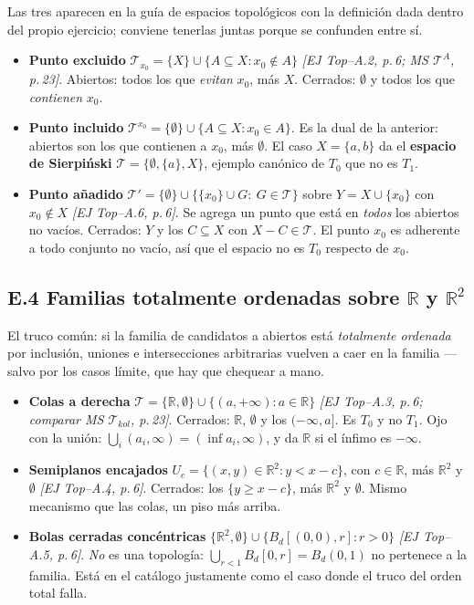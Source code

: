 \documentclass[11pt,a4paper]{article}
\theoremstyle{definition}
\theoremstyle{plain}
\newcommand{\fnt}[1]{{\normalfont\small\itshape\color{gray!150!black}[#1]}}
\newcommand{\R}{\mathbb{R}}
\newcommand{\Bola}[2]{B_d(#1,#2)}
\newcommand{\Bolac}[2]{B_d[#1,#2]}
\newcommand{\tp}{\mathcal{T}}
\begin{document}
\noindent Las tres aparecen en la guía de espacios topológicos con la definición dada dentro del propio ejercicio; conviene tenerlas juntas porque se confunden entre sí.

\begin{itemize}[leftmargin=1.4em,itemsep=3pt]
\item \textbf{Punto excluido} $\tp_{x_0}=\{X\}\cup\{A\subseteq X: x_0\notin A\}$ \fnt{EJ Top--A.2, p.\,6; MS $\tp^{A}$, p.\,23}. Abiertos: todos los que \emph{evitan} $x_0$, más $X$. Cerrados: $\emptyset$ y todos los que \emph{contienen} $x_0$.
\item \textbf{Punto incluido} $\tp^{x_0}=\{\emptyset\}\cup\{A\subseteq X: x_0\in A\}$. Es la dual de la anterior: abiertos son los que contienen a $x_0$, más $\emptyset$. El caso $X=\{a,b\}$ da el \textbf{espacio de Sierpi\'nski} $\tp=\{\emptyset,\{a\},X\}$, ejemplo canónico de $T_0$ que no es $T_1$.
\item \textbf{Punto añadido} $\tp'=\{\emptyset\}\cup\{\{x_0\}\cup G:\ G\in\tp\}$ sobre $Y=X\cup\{x_0\}$ con $x_0\notin X$ \fnt{EJ Top--A.6, p.\,6}. Se agrega un punto que está en \emph{todos} los abiertos no vacíos. Cerrados: $Y$ y los $C\subseteq X$ con $X-C\in\tp$. El punto $x_0$ es adherente a todo conjunto no vacío, así que el espacio no es $T_0$ respecto de $x_0$.
\end{itemize}

\subsection*{E.4 Familias totalmente ordenadas sobre $\R$ y $\R^2$}

\noindent El truco común: si la familia de candidatos a abiertos está \emph{totalmente ordenada} por inclusión, uniones e intersecciones arbitrarias vuelven a caer en la familia --- salvo por los casos límite, que hay que chequear a mano.

\begin{itemize}[leftmargin=1.4em,itemsep=3pt]
\item \textbf{Colas a derecha} $\tp=\{\R,\emptyset\}\cup\{(a,+\infty): a\in\R\}$ \fnt{EJ Top--A.3, p.\,6; comparar MS $\tp_{kol}$, p.\,23}. Cerrados: $\R$, $\emptyset$ y los $(-\infty,a]$. Es $T_0$ y no $T_1$. Ojo con la unión: $\bigcup_i (a_i,\infty)=(\inf a_i,\infty)$, y da $\R$ si el ínfimo es $-\infty$.
\item \textbf{Semiplanos encajados} $U_c=\{(x,y)\in\R^2: y<x-c\}$, con $c\in\R$, más $\R^2$ y $\emptyset$ \fnt{EJ Top--A.4, p.\,6}. Cerrados: los $\{y\ge x-c\}$, más $\R^2$ y $\emptyset$. Mismo mecanismo que las colas, un piso más arriba.
\item \textbf{Bolas cerradas concéntricas} $\{\R^2,\emptyset\}\cup\{\Bolac{(0,0)}{r}: r>0\}$ \fnt{EJ Top--A.5, p.\,6}. \emph{No} es una topología: $\bigcup_{r<1}\Bolac{0}{r}=\Bola{0}{1}$ no pertenece a la familia. Está en el catálogo justamente como el caso donde el truco del orden total falla.
\end{itemize}
\end{document}
